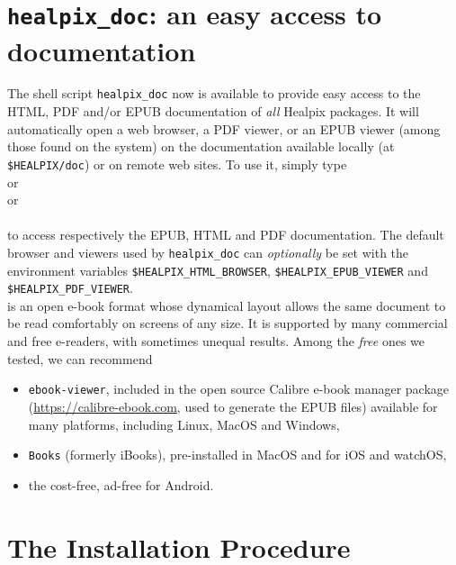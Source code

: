 \documentclass[12pt,twoside]{article}
\makeatletter
\newcommand{\nop}[1]{\Hy@raisedlink{\hypertarget{#1}{}}}
\newcommand{\mytarget}[1]{\nop{#1}}%
\newcommand{\mytarget}[1]{\label{#1}}
\makeatother
\begin{document}
\section{\texttt{healpix\_doc}: an easy access to \healpix documentation}
\mytarget{install:healpix_doc}
The shell script \texttt{healpix\_doc} now is available to provide easy
access to the HTML, PDF and/or EPUB documentation of {\em all} Healpix packages.
It will automatically open a web browser, a PDF viewer, or an EPUB viewer (among those found on the
system) on the documentation
available locally (at \texttt{\$HEALPIX/doc}) or on remote web sites. To use it, simply type\\
 or\\
 or\\
\\
to access respectively the EPUB, HTML and PDF documentation. The default browser and
viewers used by \texttt{healpix\_doc} can {\em optionally} be set with the
environment variables
\texttt{\$HEALPIX\_HTML\_BROWSER}, 
\texttt{\$HEALPIX\_EPUB\_VIEWER} and
\texttt{\$HEALPIX\_PDF\_VIEWER}.\\
 is an open e-book format whose dynamical layout allows the same document to be read comfortably on 
screens of any size.
It is supported by many commercial and free e-readers, with sometimes unequal results.
Among the {\em free} ones we tested, we can recommend
\begin{itemize}
\item \texttt{ebook-viewer}, included in the open source Calibre e-book manager package 
(\url{https://calibre-ebook.com}, used to generate the \healpix EPUB files)
available for many platforms, including Linux, MacOS and Windows,
\item \texttt{Books} (formerly iBooks), pre-installed in MacOS and  for iOS and watchOS,
\item the cost-free, ad-free 
 for Android.
\end{itemize}



\section{The Installation Procedure}
\end{document}
